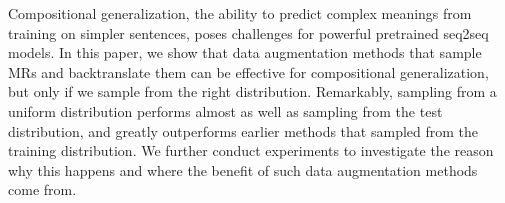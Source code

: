 Compositional generalization, the ability to predict complex meanings from training on simpler sentences, poses challenges for powerful pretrained seq2seq models.  In this paper, we show that data augmentation methods that sample MRs and backtranslate them can be effective for compositional generalization, but only if we sample from the right distribution.   Remarkably, sampling from a uniform distribution performs almost as well as sampling from the test distribution, and greatly outperforms earlier methods that sampled from the training distribution. We further conduct experiments to investigate the reason why this happens and where the benefit of such data augmentation methods come from.